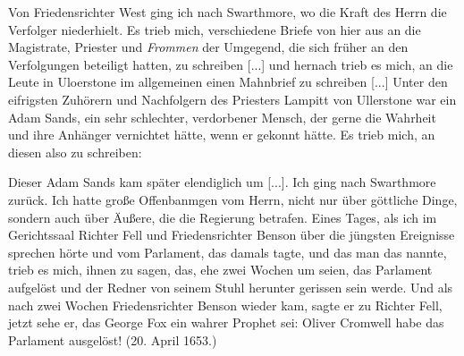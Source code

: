 Von Friedensrichter West ging ich nach Swarthmore, wo
die Kraft des Herrn die Verfolger niederhielt. Es trieb mich,
verschiedene Briefe von hier aus an die Magistrate, Priester und
\textit{Frommen} der Umgegend, die sich früher an den Verfolgungen
beteiligt hatten, zu schreiben [...] und hernach trieb es mich, an
die Leute in Uloerstone im allgemeinen einen Mahnbrief zu
schreiben [...]
Unter den eifrigsten Zuhörern und Nachfolgern des Priesters
Lampitt von Ullerstone war ein Adam Sands, 
ein sehr schlechter,
verdorbener Mensch, der gerne die Wahrheit und ihre Anhänger
vernichtet hätte, wenn er gekonnt hätte. Es trieb mich, an diesen
also zu schreiben:


Dieser Adam Sands kam später elendiglich um [...].
Ich ging nach Swarthmore zurück. Ich hatte große 
Offenbanmgen vom Herrn, nicht nur über 
göttliche Dinge, sondern
auch über Äußere, die die Regierung 
betrafen. Eines Tages,
als ich im Gerichtssaal Richter Fell 
und Friedensrichter Benson
über die jüngsten Ereignisse sprechen hörte und vom Parlament,
das damals tagte, und das man das  nannte,
trieb es mich, ihnen zu sagen, das, ehe zwei Wochen um seien,
das Parlament aufgelöst und der Redner von seinem Stuhl herunter
gerissen sein werde. Und als nach zwei Wochen Friedensrichter
Benson wieder kam, sagte er zu Richter Fell, jetzt sehe er, das
George Fox ein wahrer Prophet 
sei: Oliver Cromwell habe das
Parlament ausgelöst! (20. April 1653.)

